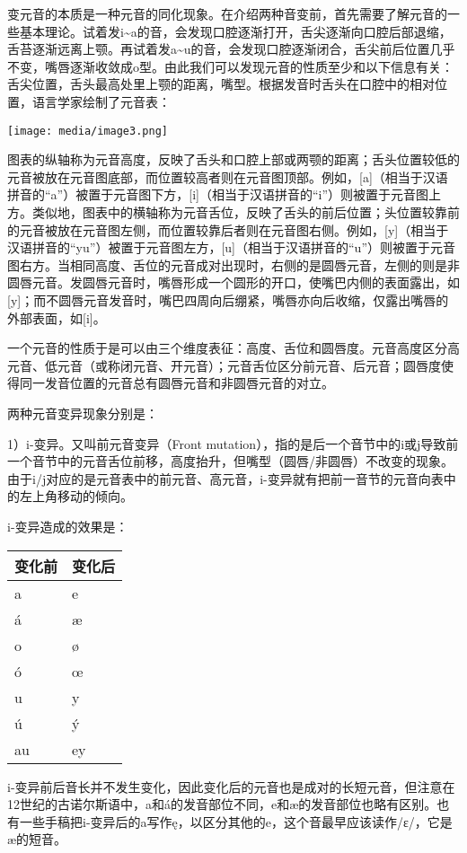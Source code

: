 变元音的本质是一种元音的同化现象。在介绍两种音变前，首先需要了解元音的一些基本理论。试着发i\textasciitilde a的音，会发现口腔逐渐打开，舌尖逐渐向口腔后部退缩，舌苔逐渐远离上颚。再试着发a\textasciitilde u的音，会发现口腔逐渐闭合，舌尖前后位置几乎不变，嘴唇逐渐收敛成o型。由此我们可以发现元音的性质至少和以下信息有关：舌尖位置，舌头最高处里上颚的距离，嘴型。根据发音时舌头在口腔中的相对位置，语言学家绘制了元音表：

\texttt{[image: media/image3.png]}

图表的纵轴称为元音高度，反映了舌头和口腔上部或两颚的距离；舌头位置较低的元音被放在元音图底部，而位置较高者则在元音图顶部。例如，{[}a{]}（相当于汉语拼音的``a''）被置于元音图下方，{[}i{]}（相当于汉语拼音的``i''）则被置于元音图上方。类似地，图表中的横轴称为元音舌位，反映了舌头的前后位置；头位置较靠前的元音被放在元音图左侧，而位置较靠后者则在元音图右侧。例如，{[}y{]}（相当于汉语拼音的``yu''）被置于元音图左方，{[}u{]}（相当于汉语拼音的``u''）则被置于元音图右方。当相同高度、舌位的元音成对出现时，右侧的是圆唇元音，左侧的则是非圆唇元音。发圆唇元音时，嘴唇形成一个圆形的开口，使嘴巴内侧的表面露出，如{[}y{]}；而不圆唇元音发音时，嘴巴四周向后绷紧，嘴唇亦向后收缩，仅露出嘴唇的外部表面，如{[}i{]}。

一个元音的性质于是可以由三个维度表征：高度、舌位和圆唇度。元音高度区分高元音、低元音（或称闭元音、开元音）；元音舌位区分前元音、后元音；圆唇度使得同一发音位置的元音总有圆唇元音和非圆唇元音的对立。

两种元音变异现象分别是：

1）i-变异。又叫前元音变异（Front
mutation），指的是后一个音节中的i或j导致前一个音节中的元音舌位前移，高度抬升，但嘴型（圆唇/非圆唇）不改变的现象。由于i/j对应的是元音表中的前元音、高元音，i-变异就有把前一音节的元音向表中的左上角移动的倾向。

i-变异造成的效果是：

\begin{longtable}{ll}
\toprule
变化前 & 变化后 \\
\midrule
\endhead
\bottomrule
\endfoot
a & e \\
á & æ \\
o & ø \\
ó & œ \\
u & y \\
ú & ý \\
au & ey \\
\end{longtable}

i-变异前后音长并不发生变化，因此变化后的元音也是成对的长短元音，但注意在12世纪的古诺尔斯语中，a和á的发音部位不同，e和æ的发音部位也略有区别。也有一些手稿把i-变异后的a写作ę，以区分其他的e，这个音最早应该读作/ɛ/，它是æ的短音。

